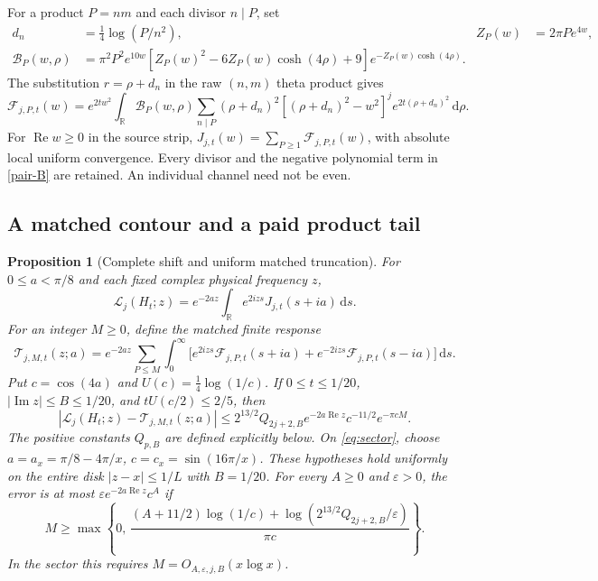 \documentclass[11pt]{article}
\newtheorem{proposition}[theorem]{Proposition}
\theoremstyle{definition}
\theoremstyle{remark}
\newcommand{\dd}{\,\mathrm d}
\newcommand{\Rea}{\operatorname{Re}}
\newcommand{\Ima}{\operatorname{Im}}
\begin{document}
For a product $P=nm$ and each divisor $n\mid P$, set
\begin{align}
 d_n&=\tfrac14\log(P/n^2),&
 Z_P(w)&=2\pi P e^{4w},\nonumber\\
 \mathcal B_P(w,\rho)
 &=\pi^2P^2e^{10w}
 [Z_P(w)^2-6Z_P(w)\cosh(4\rho)+9]
 e^{-Z_P(w)\cosh(4\rho)}. \label{pair-B}
\end{align}
The substitution $r=\rho+d_n$ in the raw $(n,m)$ theta product gives
\begin{equation}
 \mathcal F_{j,P,t}(w)=e^{2tw^2}\int_{\mathbb R}
 \mathcal B_P(w,\rho)\sum_{n\mid P}
 (\rho+d_n)^2[(\rho+d_n)^2-w^2]^j
 e^{2t(\rho+d_n)^2}\dd\rho. \label{pair-F}
\end{equation}
For $\Rea w\ge0$ in the source strip,
$J_{j,t}(w)=\sum_{P\ge1}\mathcal F_{j,P,t}(w)$, with absolute local
uniform convergence. Every divisor and the negative polynomial term
in \eqref{pair-B} are retained. An individual channel need not be even.

\subsection{A matched contour and a paid product tail}

\begin{proposition}[Complete shift and uniform matched truncation]
\label{pair-tail-prop}
For $0\le a<\pi/8$ and each fixed complex physical frequency $z$,
\begin{equation}
 \mathscr L_j(H_t;z)=e^{-2az}\int_{\mathbb R}
 e^{2izs}J_{j,t}(s+ia)\dd s. \label{pair-shift}
\end{equation}
For an integer $M\ge0$, define the matched finite response
\begin{equation}
 \mathcal T_{j,M,t}(z;a)=e^{-2az}\sum_{P\le M}\int_0^\infty
 \big[e^{2izs}\mathcal F_{j,P,t}(s+ia)
     +e^{-2izs}\mathcal F_{j,P,t}(s-ia)\big]\dd s. \label{pair-T}
\end{equation}
Put $c=\cos(4a)$ and $U(c)=\tfrac14\log(1/c)$.
If $0\le t\le1/20$, $|\Ima z|\le B\le1/20$, and
$tU(c/2)\le2/5$, then
\begin{equation}
 |\mathscr L_j(H_t;z)-\mathcal T_{j,M,t}(z;a)|
 \le 2^{13/2}Q_{2j+2,B}e^{-2a\Rea z}c^{-11/2}e^{-\pi cM}.
 \label{pair-tail}
\end{equation}
The positive constants $Q_{p,B}$ are defined explicitly below.
On \eqref{eq:sector}, choose
$a=a_x=\pi/8-4\pi/x$, $c=c_x=\sin(16\pi/x)$.
These hypotheses hold uniformly on the entire disk $|z-x|\le1/L$
with $B=1/20$.
For every $A\ge0$ and $\varepsilon>0$, the error is at most
$\varepsilon e^{-2a\Rea z}c^A$ if
\begin{equation}
 M\ge\max\left\{0,\,
 \frac{(A+11/2)\log(1/c)+
 \log(2^{13/2}Q_{2j+2,B}/\varepsilon)}{\pi c}\right\}.
 \label{pair-cutoff}
\end{equation}
In the sector this requires $M=O_{A,\varepsilon,j,B}(x\log x)$.
\end{proposition}
\end{document}
